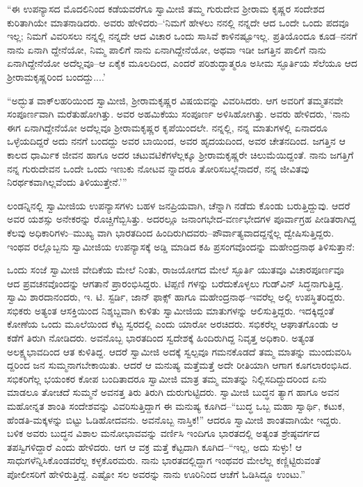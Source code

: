 “ಈ ಉಪನ್ಯಾಸದ ಮೊದಲಿನಿಂದ ಕಡೆಯವರೆಗೂ ಸ್ವಾಮೀಜಿ ತಮ್ಮ ಗುರುದೇವ ಶ್ರೀರಾಮ ಕೃಷ್ಣರ ಸಂದೇಶದ ಕುರಿತಾಗಿಯೇ ಮಾತನಾಡಿದರು. ಅವರು ಹೇಳಿದರು–‘ನಿಮಗೆ ಹೇಳಲು ನನಲ್ಲಿ ನನ್ನದೇ ಆದ ಒಂದೇ ಒಂದು ಪದವೂ ಇಲ್ಲ; ನಿಮಗೆ ವಿವರಿಸಲು ನನ್ನಲ್ಲಿ ನನ್ನದೇ ಆದ ವಿಚಾರ ಒಂದು ಸಾಸಿವೆ ಕಾಳಿನಷ್ಟೂಇಲ್ಲ. ಪ್ರತಿಯೊಂದೂ ಕೂಡ–ನನಗೆ ನಾನು ಏನಾಗಿ ದ್ದೇನೆಯೋ, ನಿಮ್ಮ ಪಾಲಿಗೆ ನಾನು ಏನಾಗಿದ್ದೇನೆಯೋ, ಅಥವಾ ಇಡೀ ಜಗತ್ತಿನ ಪಾಲಿಗೆ ನಾನು ಏನಾಗಿದ್ದೇನೆಯೋ ಅದೆಲ್ಲವೂ–ಆ ಏಕೈಕ ಮೂಲದಿಂದ, ಎಂದರೆ ಪರಿಶುದ್ಧಾತ್ಮರೂ ಅಸೀಮ ಸ್ಫೂರ್ತಿಯ ಸೆಲೆಯೂ ಆದ ಶ್ರೀರಾಮಕೃಷ್ಣರಿಂದ ಬಂದದ್ದು....’

“ಅದ್ಭುತ ವಾಕ್​ಲಹರಿಯಿಂದ ಸ್ವಾಮೀಜಿ, ಶ್ರೀರಾಮಕೃಷ್ಣರ ವಿಷಯವನ್ನು ವಿವರಿಸಿದರು. ಆಗ ಅವರಿಗೆ ತಮ್ಮತನವೇ ಸಂಪೂರ್ಣವಾಗಿ ಮರೆತುಹೋಗಿತ್ತು. ಅವರ ಅಹಮಿಕೆಯು ಸಂಪೂರ್ಣ ಅಳಿಸಿಹೋಗಿತ್ತು. ಅವರು ಹೇಳಿದರು, ‘ನಾನು ಈಗ ಏನಾಗಿದ್ದೇನೆಯೋ ಅದೆಲ್ಲವೂ ಶ್ರೀರಾಮಕೃಷ್ಣರ ಕೃಪೆಯಿಂದಲೇ. ನನ್ನಲ್ಲಿ, ನನ್ನ ಮಾತುಗಳಲ್ಲಿ ಏನಾದರೂ ಒಳ್ಳೆಯದಿದ್ದರೆ ಅದು ನನಗೆ ಬಂದದ್ದು ಅವರ ಬಾಯಿಂದ, ಅವರ ಹೃದಯದಿಂದ, ಅವರ ಚೇತನದಿಂದ. ಜಗತ್ತಿನ ಆ ಕಾಲದ ಧಾರ್ಮಿಕ ಜೀವನ ಹಾಗೂ ಅದರ ಚಟುವಟಿಕೆಗಳೆಲ್ಲಕ್ಕೂ ಶ್ರೀರಾಮಕೃಷ್ಣರೇ ಚಿಲುಮೆಯಿದ್ದಂತೆ. ನಾನು ಜಗತ್ತಿಗೆ ನನ್ನ ಗುರುದೇವನ ಒಂದೇ ಒಂದು ಇಣುಕು ನೋಟವ ನ್ನಾದರೂ ತೋರಿಸಬಲ್ಲೆನಾದರೆ, ನನ್ನ ಜೀವಿತವು ನಿರರ್ಥಕವಾಗಿಲ್ಲವೆಂದು ತಿಳಿಯುತ್ತೇನೆ.’”

ಲಂಡನ್ನಿನಲ್ಲಿ ಸ್ವಾಮೀಜಿಯ ಉಪನ್ಯಾಸಗಳು ಬಹಳ ಜನಪ್ರಿಯವಾಗಿ, ಚೆನ್ನಾಗಿ ನಡೆದು ಕೊಂಡು ಬರುತ್ತಿದ್ದುವು. ಆದರೆ ಅವರ ಯಶಸ್ಸು ಅನೇಕರನ್ನು ರೊಚ್ಚಿಗೆಬ್ಬಿಸಿತ್ತು. ಅದರಲ್ಲೂ ಜನಾಂಗಭೇದ-ವರ್ಣಭೇದಗಳ ಪೂರ್ವಾಗ್ರಹ ಪೀಡಿತರಾಗಿದ್ದ ಕೆಲವು ಅಧಿಕಾರಿಗಳು–ಮುಖ್ಯ ವಾಗಿ ಭಾರತದಿಂದ ಹಿಂದಿರುಗಿದವರು–ಪೌರ್ವಾತ್ಯವಾದದ್ದನ್ನೆಲ್ಲ ದ್ವೇಷಿಸುತ್ತಿದ್ದರು. ಇಂಥವ ರಲ್ಲೊಬ್ಬನು ಸ್ವಾಮೀಜಿಯ ಉಪನ್ಯಾಸಕ್ಕೆ ಅಡ್ಡಿ ಮಾಡಿದ ಕಹಿ ಪ್ರಸಂಗವೊಂದನ್ನು ಮಹೇಂದ್ರನಾಥ ತಿಳಿಸುತ್ತಾನೆ:

ಒಂದು ಸಂಜೆ ಸ್ವಾಮೀಜಿ ವೇದಿಕೆಯ ಮೇಲೆ ನಿಂತು, ರಾಜಯೋಗದ ಮೇಲೆ ಸ್ಫೂರ್ತಿ ಯುತವೂ ವಿಚಾರಪೂರ್ಣವೂ ಆದ ಪ್ರವಚನವೊಂದನ್ನು ಆಗತಾನೆ ಪ್ರಾರಂಭಿಸಿದ್ದರು. ಟಿಪ್ಪಣಿ ಗಳನ್ನು ಬರೆದುಕೊಳ್ಳಲು ಗುಡ್​ವಿನ್ ಸಿದ್ಧನಾಗುತ್ತಿದ್ದ. ಸ್ವಾಮಿ ಶಾರದಾನಂದರು, ಇ. ಟಿ. ಸ್ಟರ್ಡಿ, ಜಾನ್ ಫಾಕ್ಸ್ ಹಾಗೂ ಮಹೇಂದ್ರನಾಥ–ಇವರೆಲ್ಲ ಅಲ್ಲಿ ಉಪಸ್ಥಿತರಿದ್ದರು. ಸಭಿಕರು ಅತ್ಯಂತ ಆಸಕ್ತಿಯಿಂದ ನಿಶ್ಶಬ್ದವಾಗಿ ಕುಳಿತು ಸ್ವಾಮೀಜಿಯ ಮಾತುಗಳನ್ನು ಆಲಿಸುತ್ತಿದ್ದರು. ಇದಕ್ಕಿದ್ದಂತೆ ಕೋಣೆಯ ಒಂದು ಮೂಲೆಯಿಂದ ಕೆಟ್ಟ ಸ್ವರದಲ್ಲಿ  ಎಂದು ಯಾರೋ ಅರಚಿದರು. ಸಭಿಕರೆಲ್ಲ ಆಘಾತಗೊಂಡು ಆ ಕಡೆಗೆ ತಿರುಗಿ ನೋಡಿದರು. ಅವನೊಬ್ಬ ಭಾರತದಿಂದ ಸ್ವದೇಶಕ್ಕೆ ಹಿಂದಿರುಗಿದ್ದ ನಿವೃತ್ತ ಅಧಿಕಾರಿ. ಅತ್ಯಂತ ಅಲಕ್ಷ್ಯಭಾವದಿಂದ ಆತ ಕುಳಿತಿದ್ದ. ಆದರೆ ಸ್ವಾಮೀಜಿ ಅದಕ್ಕೆ ಸ್ವಲ್ಪವೂ ಗಮನಕೊಡದೆ ತಮ್ಮ ಮಾತನ್ನು ಮುಂದುವರಿಸಿ ದ್ದರಿಂದ ಜನ ಸುಮ್ಮನಾಗಬೇಕಾಯಿತು. ಆದರೆ ಆ ಮನುಷ್ಯ ಮತ್ತೆಮತ್ತೆ ಅದೇ ರೀತಿಯಾಗಿ ಆಗಾಗ ಕೂಗಲಾರಂಭಿಸಿದ. ಸಭಿಕರಿಗೆಲ್ಲ ಭಯಂಕರ ಕೋಪ ಬಂದಿತಾದರೂ ಸ್ವಾಮೀಜಿ ಮಾತ್ರ ತಮ್ಮ ಮಾತನ್ನು ನಿಲ್ಲಿಸದಿದ್ದುದರಿಂದ ಏನು ಮಾಡಲೂ ತೋಚದೆ ಸುಮ್ಮನೆ ಅವನತ್ತ ತಿರು ತಿರುಗಿ ದುರುಗುಟ್ಟಿದರು. ಸ್ವಾಮೀಜಿ ಬುದ್ಧನ ತ್ಯಾಗ ಹಾಗೂ ಅವನ ಮಹೋನ್ನತ ಶಾಂತಿ ಸಂದೇಶವನ್ನು ವಿವರಿಸುತ್ತಿದ್ದಾಗ ಈ ಮನುಷ್ಯ ಕೂಗಿದ–“ಬುದ್ಧ ಒಬ್ಬ ಮಹಾ ಸ್ವಾರ್ಥಿ, ಕಟುಕ, ಹೆಂಡತಿ-ಮಕ್ಕಳನ್ನು ಬಿಟ್ಟು ಓಡಿಹೋದವನು. ಅವನೊಬ್ಬ ನಾಸ್ತಿಕ!” ಆದರೂ ಸ್ವಾಮೀಜಿ ಶಾಂತವಾಗಿಯೇ ಇದ್ದರು. ಬಳಿಕ ಅವರು ಬುದ್ಧನ ವಿಶಾಲ ಮನೋಭಾವವನ್ನು ವರ್ಣಿಸಿ ಇಂದಿಗೂ ಭಾರತದಲ್ಲಿ ಅತ್ಯಂತ ಶ್ರೇಷ್ಠವರ್ಗದ ತಪಸ್ವಿಗಳಿದ್ದಾರೆ ಎಂದು ಹೇಳಿದರು. ಆಗ ಆ ವಕ್ರ ಮತ್ತೆ ಕೆಟ್ಟದಾಗಿ ಕೂಗಿದ–“ಇಲ್ಲ, ಅದು ಸುಳ್ಳು! ಆ ಸಾಧುಗಳೆನ್ನಿಸಿಕೊಂಡವರೆಲ್ಲ ಕಳ್ಳಕೊರಮರು. ನಾನು ಭಾರತದಲ್ಲಿದ್ದಾಗ ಇಂಥವರ ಮೇಲೆಲ್ಲ ಕಣ್ಣಿಟ್ಟಿರುವಂತೆ ಪೋಲೀಸರಿಗೆ ಹೇಳಿರುತ್ತಿದ್ದೆ. ಎಷ್ಟೋ ಸಲ ಅವರನ್ನು ನಾನು ಊರಿನಿಂದ ಆಚೆಗೆ ಓಡಿಸಿದ್ದೂ ಉಂಟು.”

